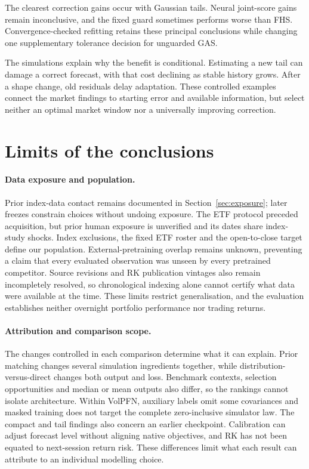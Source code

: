 The clearest correction gains occur with Gaussian tails. Neural joint-score gains remain inconclusive, and the fixed guard sometimes performs worse than FHS. Convergence-checked refitting retains these principal conclusions while changing one supplementary tolerance decision for unguarded GAS.

The simulations explain why the benefit is conditional. Estimating a new tail can damage a correct forecast, with that cost declining as stable history grows. After a shape change, old residuals delay adaptation. These controlled examples connect the market findings to starting error and available information, but select neither an optimal market window nor a universally improving correction.

\section{Limits of the conclusions}

\paragraph{Data exposure and population.}
Prior index-data contact remains documented in Section~\ref{sec:exposure}; later freezes constrain choices without undoing exposure. The ETF protocol preceded acquisition, but prior human exposure is unverified and its dates share index-study shocks. Index exclusions, the fixed ETF roster and the open-to-close target define our population. External-pretraining overlap remains unknown, preventing a claim that every evaluated observation was unseen by every pretrained competitor. Source revisions and RK publication vintages also remain incompletely resolved, so chronological indexing alone cannot certify what data were available at the time. These limits restrict generalisation, and the evaluation establishes neither overnight portfolio performance nor trading returns.

\paragraph{Attribution and comparison scope.}
The changes controlled in each comparison determine what it can explain. Prior matching changes several simulation ingredients together, while distribution-versus-direct changes both output and loss. Benchmark contexts, selection opportunities and median or mean outputs also differ, so the rankings cannot isolate architecture. Within VolPFN, auxiliary labels omit some covariances and masked training does not target the complete zero-inclusive simulator law. The compact and tail findings also concern an earlier checkpoint. Calibration can adjust forecast level without aligning native objectives, and RK has not been equated to next-session return risk. These differences limit what each result can attribute to an individual modelling choice.

